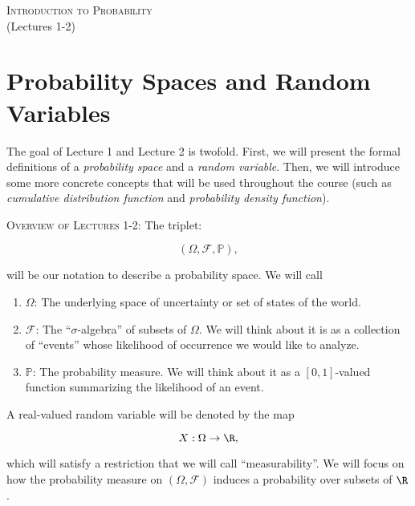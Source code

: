 \documentclass[11pt]{article} %
\begin{document}
\onehalfspace

\vspace*{\fill}
\begingroup
\centering

\Large {\scshape Introduction to Probability}\\

(Lectures 1-2)

\endgroup
\vspace*{\fill}

\newpage

\section{Probability Spaces and Random Variables}
The goal of Lecture 1 and Lecture 2 is twofold. First, we will present the formal definitions of a \emph{probability space} and a \emph{random variable}. Then, we will introduce some more concrete concepts that will be used throughout the course (such as  \emph{cumulative distribution function} and \emph{probability density function}). 

{\scshape Overview of Lectures 1-2:} The triplet:

$$(\Omega, \mathcal{F}, \mathbb{P}),$$

\noindent will be our notation to describe a probability space. We will call 

\begin{enumerate}
\item $\Omega$: The underlying space of uncertainty or set of states of the world. 

\item $\mathcal{F}$: The ``$\sigma$-algebra'' of subsets of $\Omega$. We will think about it is as a collection of ``events'' whose likelihood of occurrence we would like to analyze. 

\item $\mathbb{P}$: The probability measure. We will think about it as a $[0,1]$-valued function summarizing the likelihood of an event. 

\end{enumerate}

A real-valued random variable  will be denoted by the map

$$X: \Omega \rightarrow \R,$$ 

\noindent which will satisfy a restriction that we will call ``measurability''. We will focus on how the probability measure on $(\Omega, \mathcal{F})$ induces a probability over subsets of $\R$. 
\end{document}
